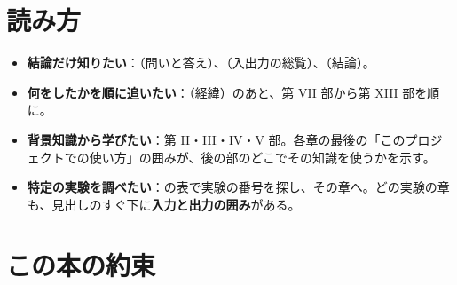 \section*{読み方}

\begin{itemize}
\item \textbf{結論だけ知りたい}：（問いと答え）、（入出力の総覧）、（結論）。
\item \textbf{何をしたかを順に追いたい}：（経緯）のあと、第 VII 部から第 XIII 部を順に。
\item \textbf{背景知識から学びたい}：第 II・III・IV・V 部。各章の最後の「このプロジェクトでの使い方」の囲みが、後の部のどこでその知識を使うかを示す。
\item \textbf{特定の実験を調べたい}：の表で実験の番号を探し、その章へ。どの実験の章も、見出しのすぐ下に\textbf{入力と出力の囲み}がある。
\end{itemize}

\section*{この本の約束}

\begin{iobox}[入力と出力の囲み（見本）]
\end{iobox}

